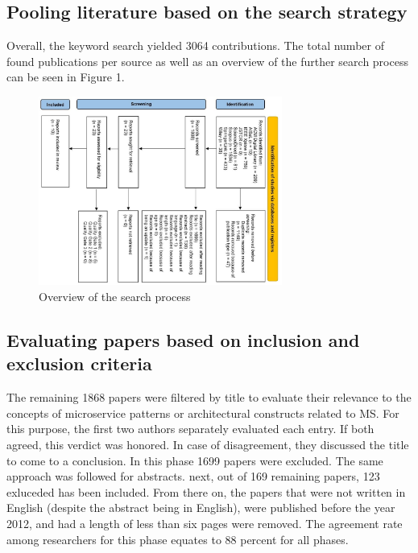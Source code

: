 \documentclass[a4paper,11pt,article,oneside]{memoir}
\begin{document}

\subsection{Pooling literature based on the search strategy}
Overall, the keyword search yielded 3064 contributions. The total number of found publications per source as well as an overview of the further search process can be seen in Figure 1.

\begin{figure}
    \centering 
    \includegraphics[width=8cm]{Media/PRISMA-Flowchart.JPG}
    \caption{Overview of the search process}
    \label{fig:PRISMA}
\end{figure}

\subsection{Evaluating papers based on inclusion and exclusion criteria}

The remaining 1868 papers were filtered by title to evaluate their relevance to the concepts of microservice patterns or architectural constructs related to MS. For this purpose, the first two authors separately evaluated each entry. If both agreed, this verdict was honored. In case of disagreement, they discussed the title to come to a conclusion. In this phase 1699 papers were excluded. The same approach was followed for abstracts. next, out of 169 remaining papers, 123 exluceded has been included. From there on, the papers that were not written in English (despite the abstract being in English), were published before the year 2012, and had a length of less than six pages were removed. The agreement rate among researchers for this phase equates to 88 percent for all phases.
\end{document}
